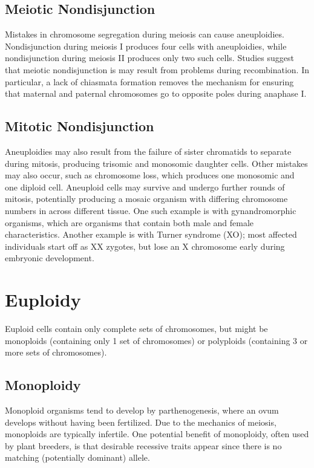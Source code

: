 \documentclass[12pt,titlepage]{article}
\begin{document}
    \subsection{Meiotic Nondisjunction}
      Mistakes in chromosome segregation during meiosis can cause aneuploidies. Nondisjunction during meiosis I produces four cells with
      aneuploidies, while nondisjunction during meiosis II produces only two such cells. Studies suggest that meiotic nondisjunction is may
      result from problems during recombination. In particular, a lack of chiasmata formation removes the mechanism for ensuring that
      maternal and paternal chromosomes go to opposite poles during anaphase I.

    \subsection{Mitotic Nondisjunction}
      Aneuploidies may also result from the failure of sister chromatids to separate during mitosis, producing trisomic and monosomic daughter
      cells. Other mistakes may also occur, such as chromosome loss, which produces one monosomic and one diploid cell. Aneuploid cells may
      survive and undergo further rounds of mitosis, potentially producing a mosaic organism with differing chromosome numbers in across
      different tissue. One such example is with gynandromorphic organisms, which are organisms that contain both male and female characteristics.
      Another example is with Turner syndrome (XO); most affected individuals start off as XX zygotes, but lose an X chromosome early during embryonic
      development.

  \newpage

  \section{Euploidy}
    Euploid cells contain only complete sets of chromosomes, but might be monoploids (containing only 1 set of chromosomes) or polyploids
    (containing 3 or more sets of chromosomes).

    \subsection{Monoploidy}
      Monoploid organisms tend to develop by parthenogenesis, where an ovum develops without having been fertilized. Due to the mechanics of meiosis,
      monoploids are typically infertile. One potential benefit of monoploidy, often used by plant breeders, is that desirable recessive traits appear
      since there is no matching (potentially dominant) allele.
\end{document}
